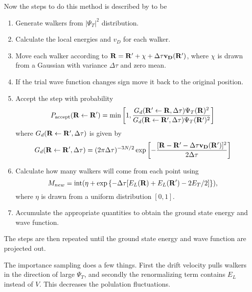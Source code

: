 Now the steps to do this method is described by \cite{foulkes2001} to be
\begin{enumerate}
  \item{Generate walkers from $\left| \Psi_T \right|^2$ distribution.}
  \item{Calculate the local energies and $v_D$ for each walker.}
  \item{Move each walker according to $\mathbf{R} = \mathbf{R}' + \chi + \Delta\tau \mathbf{v_D}(\mathbf{R}')$, where $\chi$ is drawn from a Gaussian with variance $\Delta\tau$ and zero mean.}
  \item{If the trial wave function changes sign move it back to the original position.}
  \item{Accept the step with probability
    \begin{equation}
      P_{\mathrm{accept}}(\mathbf{R} \leftarrow \mathbf{R}') = \mathrm{min}\left[ 1, \frac{G_d(\mathbf{R}' \leftarrow \mathbf{R}, \Delta\tau) \Psi_T(\mathbf{R})^2}{G_d(\mathbf{R} \leftarrow \mathbf{R}', \Delta\tau) \Psi_T(\mathbf{R}')^2} \right]
    \end{equation}
    where $G_d(\mathbf{R} \leftarrow \mathbf{R}', \Delta\tau)$ is given by
    \begin{equation}
      G_d(\mathbf{R} \leftarrow \mathbf{R}', \Delta\tau) = (2\pi\Delta\tau)^{-3N/2} \exp{\left[ -\frac{[\mathbf{R}-\mathbf{R}'-\Delta\tau\mathbf{v_D}(\mathbf{R}')]^2}{2\Delta\tau} \right]}
    \end{equation}
  }
  \item{Calculate how many walkers will come from each point using
    \begin{equation}
      M_{new} = \mathrm{int}(\eta+\exp\left\{-\Delta\tau[E_L(\mathbf{R})+E_L(\mathbf{R}')-2E_T/2]\right\}),
    \end{equation}
    where $\eta$ is drawn from a uniform distribution $[0,1]$.
  }
  \item{Accumulate the appropriate quantities to obtain the ground state energy and wave function.}
\end{enumerate}
The steps are then repeated until the ground state energy and wave function are projected out.

The importance sampling does a few things. First the drift velocity pulls walkers in the direction of large $\Psi_T$, and secondly the renormalizing term contains $E_L$ instead of $V$. This decreases the polulation fluctuations.
